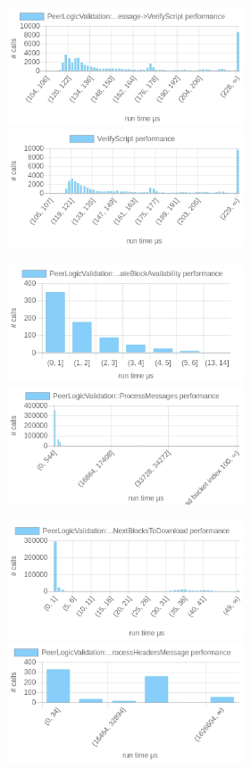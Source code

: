 \documentclass{article}
\begin{document}
\begin{table}
	\includegraphics[width=7cm]{images/mumbai/chartPeerLogicValidation_3A_3AProcessMessages-_3EProcessMessage-_3EVerifyScript.png}
	\includegraphics[width=7cm]{images/mumbai/chartVerifyScript.png}
	
	\includegraphics[width=7cm]{images/mumbai/chartPeerLogicValidation_3A_3AProcessMessages-_3EProcessMessage-_3EProcessHeadersMessage-_3EUpdateBlockAvailability.png}
	\includegraphics[width=7cm]{images/mumbai/chartPeerLogicValidation_3A_3AProcessMessages.png}
	
	\includegraphics[width=7cm]{images/mumbai/chartPeerLogicValidation_3A_3ASendMessages-_3EFindNextBlocksToDownload.png}
	\includegraphics[width=7cm]{images/mumbai/chartPeerLogicValidation_3A_3AProcessMessages-_3EProcessMessage-_3EProcessHeadersMessage.png}
	

\end{table}
\end{document}
